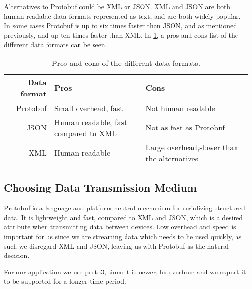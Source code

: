 Alternatives to Protobuf could be XML or JSON\@.
XML and JSON are both human readable data formats represented as text, and are both widely popular.
In some cases Protobuf is up to six times faster than JSON, and as mentioned previously, and up ten times faster than XML\cite{json_slow}.
In \cref{tab:format_pros_cons}, a pros and cons list of the different data formats can be seen.

\begin{table}
    \setlength{\tabcolsep}{10pt}
    \centering
    \begin{tabularx}{0.9\textwidth}{rXX}\toprule
        Data format & Pros                                          & Cons \\\midrule
        Protobuf    & Small overhead, fast                          & Not human readable \\
        JSON        & Human readable, \newline fast compared to XML & Not as fast as Protobuf\\
        XML         & Human readable                                & Large overhead,\newline slower than the alternatives\\\bottomrule
    \end{tabularx}
    \caption{Pros and cons of the different data formats.}\label{tab:format_pros_cons}
\end{table}

\subsection{Choosing Data Transmission Medium}
Protobuf is a language and platform neutral mechanism for serializing structured data.
It is lightweight and fast, compared to XML and JSON, which is a desired attribute when transmitting data between devices.
Low overhead and speed is important for us since we are streaming data which needs to be used quickly, as such we disregard XML and JSON, leaving us with Protobuf as the natural decision.

For our application we use proto3, since it is newer, less verbose and we expect it to be supported for a longer time period.
